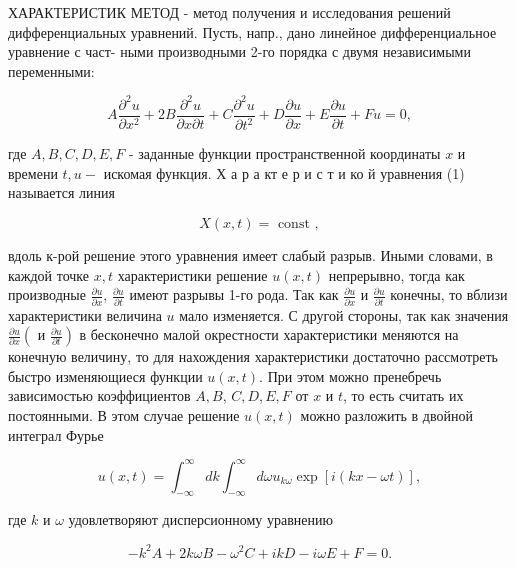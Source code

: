 \documentclass[10pt]{article}
\begin{document}
ХАРАКТЕРИСТИК МЕТОД - метод получения и исследования решений дифференциальных уравнений. Пусть, напр., дано линейное дифференциальное уравнение с част- ными производными 2-го порядка с двумя независимыми переменными:



\[

A \frac{\partial^{2} u}{\partial x^{2}}+2 B \frac{\partial^{2} u}{\partial x \partial t}+C \frac{\partial^{2} u}{\partial t^{2}}+D \frac{\partial u}{\partial x}+E \frac{\partial u}{\partial t}+F u=0,

\]



где $A, B, C, D, E, F$ - заданные функции пространственной координаты $x$ и времени $t, u-$ искомая функция. Х а р а кт е р и с т и ко й уравнения (1) называется линия



\[

X(x, t)=\text { const },

\]



вдоль к-рой решение этого уравнения имеет слабый разрыв. Иными словами, в каждой точке $x, t$ характеристики решение $u(x, t)$ непрерывно, тогда как производные $\frac{\partial u}{\partial x}$, $\frac{\partial u}{\partial t}$ имеют разрывы 1-го рода. Так как $\frac{\partial u}{\partial x}$ и $\frac{\partial u}{\partial t}$ конечны, то вблизи характеристики величина $u$ мало изменяется. С другой стороны, так как значения $\frac{\partial u}{\partial x}\left(\right.$ и $\left.\frac{\partial u}{\partial t}\right)$ в бесконечно малой окрестности характеристики меняются на конечную величину, то для нахождения характеристики достаточно рассмотреть быстро изменяющиеся функции $u(x, t)$. При этом можно пренебречь зависимостью коэффициентов $A, B$, $C, D, E, F$ от $x$ и $t$, то есть считать их постоянными. В этом случае решение $u(x, t)$ можно разложить в двойной интеграл Фурье



\[

u(x, t)=\int_{-\infty}^{\infty} d k \int_{-\infty}^{\infty} d \omega u_{k \omega} \exp [i(k x-\omega t)],

\]



где $k$ и $\omega$ удовлетворяют дисперсионному уравнению



\[

-k^{2} A+2 k \omega B-\omega^{2} C+i k D-i \omega E+F=0 .

\]
\end{document}
